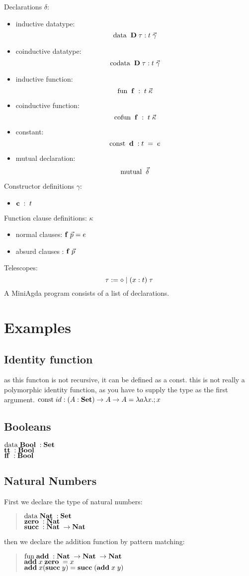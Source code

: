 Declarations $\delta$:
\begin{itemize}
\item
inductive datatype: 
\[\mathrm{data}\; \; \mathbf{D} \; \tau : t \; \vec{\gamma}\]  
\item
coinductive datatype:
\[\mathrm{codata}\; \; \mathbf{D} \; \tau : t \; \vec{\gamma}\]  
\item
inductive function:
\[\mathrm{fun}\; \; \mathbf{f} \; : \; t \; \vec{\kappa}\]
\item
coinductive function:
\[\mathrm{cofun}\; \; \mathbf{f} \; : \; t \; \vec{\kappa}\]
\item
constant:
\[\mathrm{const}\; \;  \mathbf{d} \; : t \; = \; e \]
\item
mutual declaration:
\[\mathrm{mutual}\; \; \vec{\delta}\]
\end{itemize}
Constructor definitions $\gamma$:
\begin{itemize}
\item
$ \mathbf{c} \; : \; t $ 
\end{itemize}
Function clause definitions: $ \kappa $
\begin{itemize}
\item
normal clauses: $ \mathbf{f} \; \vec{p} = e $
\item
absurd clauses : $ \mathbf{f} \; \vec{p} $
\end{itemize}
Telescopes:
\[ \tau := \diamond \;\vert\; ( x : t ) \; \tau \]
A MiniAgda program consists of a list of declarations.
\section{Examples}
\subsection{Identity function}
as this functon is not recursive, it can be defined as a const.
this is not really a polymorphic identity function, as you have to supply the
type as the first argument.
$\mathrm{const}\; id : ( A : \mathbf{Set} ) \rightarrow A \rightarrow A = \lambda a \lambda x . ; x$   
\subsection{Booleans}
$\mathrm{data}\; \mathbf{Bool}\; : \mathbf{Set}$ 
\\
$\mathbf{tt}\; : \mathbf{Bool}\; $
\\
$\mathbf{ff}\; : \mathbf{Bool}\; $
\subsection{Natural Numbers}
First we declare the type of natural numbers:
\begin{quote}
$\mathrm{data}\; \mathbf{Nat}\; : \mathbf{Set}$ 
\\
$\mathbf{zero}\; : \mathbf{Nat}\; $
\\
$\mathbf{succ}\; : \mathbf{Nat}\; \rightarrow \mathbf{Nat}\; $
\end{quote}
then we declare the addition function by pattern matching:
\begin{quote}
$\mathrm{fun}\; \mathbf{add}\; : \mathbf{Nat}\; \rightarrow \mathbf{Nat}\; \rightarrow \mathbf{Nat}\;$
\\
$\mathbf{add}\; x \; \mathbf{zero}\; = x $
\\
$\mathbf{add}\; x (\mathbf{succ}\; y) = \mathbf{succ}\; ( \mathbf{add}\; x \; y)  $
\end{quote}
